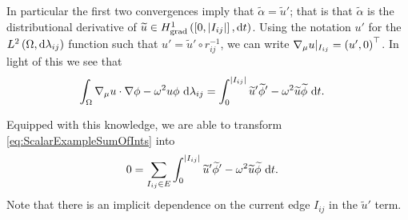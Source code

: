 In particular the first two convergences imply that $\widetilde{\alpha}=\widetilde{u}'$; that is that $\widetilde{\alpha}$ is the distributional derivative of $\widetilde{u}\in H^1_\mathrm{grad}\left( \left[ 0,\lvert I_{ij} \rvert \right], \mathrm{d}t \right)$.
Using the notation $u'$ for the $L^{2}\left( \Omega,\mathrm{d}\lambda_{ij} \right)$ function such that $u' = \widetilde{u}'\circ r_{ij}^{-1}$, we can write $\nabla_\mu u\vert_{I_{ij}} = \left( u', 0 \right)^{\top}$.
In light of this we see that
\begin{align*}
	\int_{\Omega}\nabla_\mu u \cdot \nabla\phi - \omega^2 u\phi \ \mathrm{d}\lambda_{ij}
	&= \int_0^{\lvert I_{ij} \rvert}\widetilde{u}'\widetilde{\phi}' - \omega^2\widetilde{u}\widetilde{\phi} \ \mathrm{d} t.
\end{align*}

Equipped with this knowledge, we are able to transform \eqref{eq:ScalarExampleSumOfInts} into
\begin{align}
	0 &= \sum_{I_{ij}\in E}\int_0^{\lvert I_{ij} \rvert}\widetilde{u}'\widetilde{\phi}' - \omega^2\widetilde{u}\widetilde{\phi} \ \mathrm{d} t.
\end{align}
Note that there is an implicit dependence on the current edge $I_{ij}$ in the $\widetilde{u}'$ term.